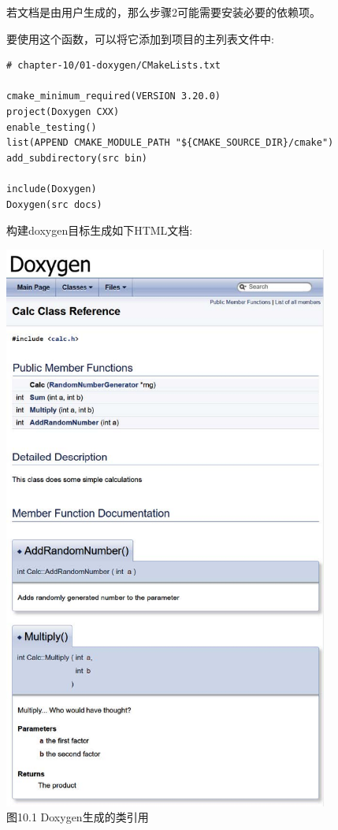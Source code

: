 若文档是由用户生成的，那么步骤2可能需要安装必要的依赖项。

要使用这个函数，可以将它添加到项目的主列表文件中:

\begin{lstlisting}[style=styleCMake]
# chapter-10/01-doxygen/CMakeLists.txt

cmake_minimum_required(VERSION 3.20.0)
project(Doxygen CXX)
enable_testing()
list(APPEND CMAKE_MODULE_PATH "${CMAKE_SOURCE_DIR}/cmake")
add_subdirectory(src bin)

include(Doxygen)
Doxygen(src docs)
\end{lstlisting}

构建doxygen目标生成如下HTML文档:

\begin{center}
\includegraphics[width=0.8\textwidth]{content/3/chapter10/images/1.jpg}\\
图10.1 Doxygen生成的类引用
\end{center}

